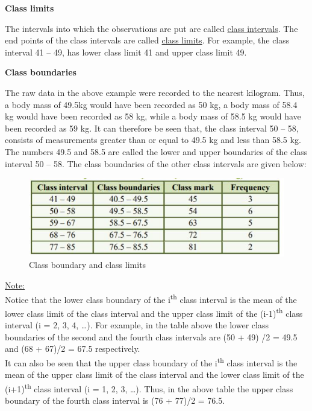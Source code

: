 \documentclass[
]{book}
\begin{document}
\textbf{Class limits}

The intervals into which the observations are put are called \uline{class
intervals}. The end points of the class intervals are called
\uline{class limits}. For example, the class interval 41 -- 49,
has lower class limit 41 and upper class limit 49.

\textbf{Class boundaries}

The raw data in the above example were recorded to the nearest kilogram.
Thus, a body mass of 49.5kg would have been recorded as 50 kg, a body
mass of 58.4 kg would have been recorded as 58 kg, while a body mass of
58.5 kg would have been recorded as 59 kg. It can therefore be seen
that, the class interval 50 -- 58, consists of measurements greater than
or equal to 49.5 kg and less than 58.5 kg. The numbers 49.5 and 58.5 are
called the lower and upper boundaries of the class interval 50 -- 58.
The class boundaries of the other class intervals are given below:

\begin{figure}

{\centering \includegraphics[width=0.9\linewidth]{images/image7} 

}

\caption{Class boundary and class limits}\label{fig:clsslmt}
\end{figure}

\uline{Note:}\\
Notice that the lower class boundary of the i\textsuperscript{th} class interval is the
mean of the lower class limit of the class interval and the upper class
limit of the (i-1)\textsuperscript{th} class interval (i = 2, 3, 4, \ldots). For example,
in the table above the lower class boundaries of the second and the
fourth class intervals are (50 + 49) /2 = 49.5 and (68 + 67)/2 = 67.5
respectively.\\
It can also be seen that the upper class boundary of the i\textsuperscript{th} class
interval is the mean of the upper class limit of the class interval and
the lower class limit of the (i+1)\textsuperscript{th} class interval (i = 1, 2, 3,
\ldots). Thus, in the above table the upper class boundary of the fourth
class interval is (76 + 77)/2 = 76.5.
\end{document}
